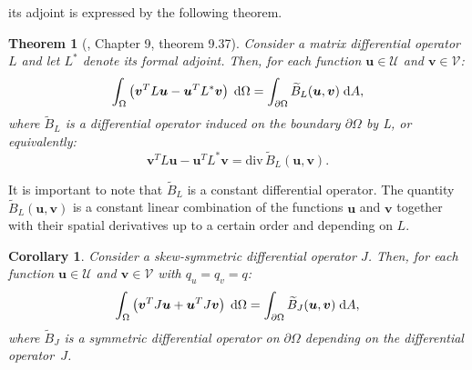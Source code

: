 \documentclass[preprint,12pt]{elsarticle}
\newtheorem{theorem}{Theorem}
\newtheorem{corollary}{Corollary}
\begin{document}
{its adjoint is expressed by the following theorem.
\begin{theorem}[\cite{PDE}, Chapter 9, theorem 9.37]
Consider a matrix differential operator $L$ and let $L^*$ denote its formal adjoint. Then, for each function $\bm{u} \in \mathcal{U}$ and $\bm{v} \in \mathcal{V}$:
\begin{equation}
\int_{\Omega} \left( \bm{v}^T L \bm{u} - \bm{u}^T L^* \bm{v}\right) \d\Omega= \int_{\partial \Omega} \widetilde{B}_L(\bm{u}, \bm{v}) \d{A},
\end{equation}
where $\widetilde{B}_L$ is a differential operator induced on the boundary $\partial\Omega$ by L, or equivalently:
\begin{equation}
\bm{v}^T L \bm{u} - \bm{u}^T L^* \bm{v} = \mathrm{div} \, \widetilde{B}_L(\bm{u}, \bm{v}).
\end{equation}
\end{theorem}
It is important to note that $\widetilde{B}_L$ is a constant differential operator. The quantity $\widetilde{B}_L(\bm{u}, \bm{v})$ is a constant linear combination of the functions $\bm{u}$ and $\bm{v}$ together with their spatial derivatives up to a certain order and depending on $L$.
\begin{corollary}
Consider a skew-symmetric differential operator $J$. Then, for each function $\bm{u} \in \mathcal{U}$ and $\bm{v} \in \mathcal{V}$ with $q_u = q_v = q$:
\begin{equation}
\int_{\Omega} \left( \bm{v}^T J \bm{u} + \bm{u}^T J \bm{v}\right) \d\Omega= \int_{\partial \Omega} \widetilde{B}_J(\bm{u}, \bm{v}) \d{A},
\end{equation}
where $\widetilde{B}_J$ is a symmetric differential operator on $\partial\Omega$ depending on the differential operator~$J$.
\end{corollary}
}
\end{document}

